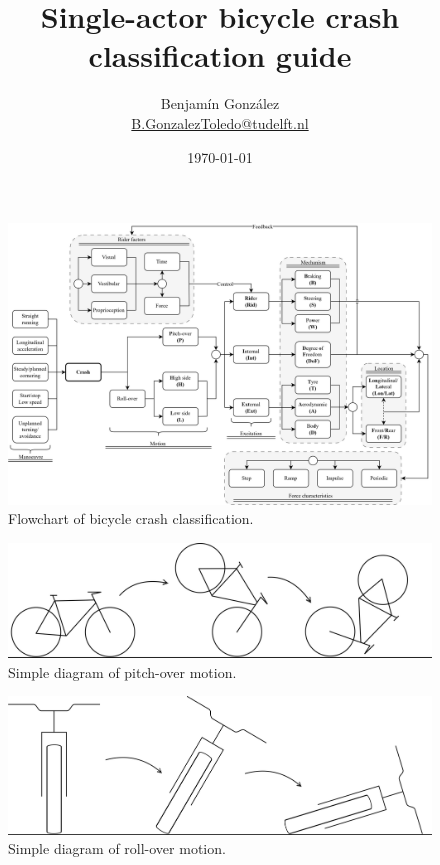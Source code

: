\documentclass{article}
\title{Single-actor bicycle crash classification guide}
\author{
  Benjam\'in Gonz\'alez\\
  \small{\href{mailto:b.gonzaleztoledo@tudelft.nl}{B.GonzalezToledo@tudelft.nl}}
  }
\date{\today}
\begin{document}
\maketitle

\begin{figure}
    \centering
    \includegraphics[angle=90, height = \textheight]{class-mindmap-v3.png}
    \caption{Flowchart of bicycle crash classification.}
    \label{fig: flowchart}
\end{figure}

\begin{figure}[h]
    \centering
    \includegraphics[width=\linewidth]{pitch-over.png}
    \caption{Simple diagram of pitch-over motion.}
    \label{fig: pitchover}
\end{figure}

\begin{figure}[h]
    \centering
    \includegraphics[width=\linewidth]{roll-over.png}
    \caption{Simple diagram of roll-over motion.}
    \label{fig: rollover}
\end{figure}
\end{document}
